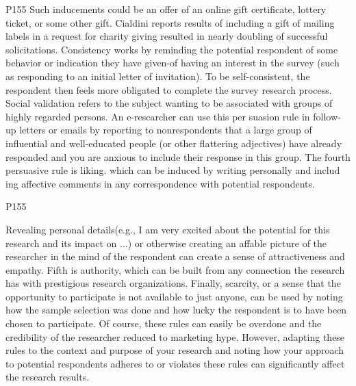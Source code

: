 \documentclass{beamer}
\begin{document}
\begin{frame}{P155}
Such inducements could be an offer of an online gift certificate, lottery ticket, or some other gift. Cialdini reports results of including a gift of mailing labels in a request for charity giving resulted in nearly doubling of successful solicitations. Consistency works by reminding the potential respondent of some behavior or indication they have given-of having an interest in the survey (such as responding to an initial letter of invitation). To be self-consistent, the respondent then feels more obligated to complete the survey research process. Social validation refers to the subject wanting to be associated with groups of highly regarded persons. An e-rescarcher can use this per suasion rule in follow-up letters or emails by reporting to nonrespondents that a large group of influential and well-educated people (or other flattering adjectives) have already responded and you are anxious to include their response in this group. The fourth persuasive rule is liking. which can be induced by writing personally and includ ing affective comments in any correspondence with potential respondents.  


\end{frame}
\begin{frame}{P155}

Revealing personal details(e.g., I am very excited about the potential for this research and its impact on ...) or otherwise creating an affable picture of the researcher in the mind of the respondent can create a sense of attractiveness and empathy. Fifth is authority, which can be built from any connection the research has with prestigious research organizations. Finally, scarcity, or a sense that the opportunity to participate is not available to just anyone, can be used by noting how the sample selection was done and how lucky the respondent is to have been chosen to participate. Of course, these rules can easily be overdone and the credibility of the researcher reduced to marketing hype. However, adapting these rules to the context and purpose of your research and noting how your approach to potential respondents adheres to or violates these rules can significantly affect the research results. 

\end{frame}
\end{document}
